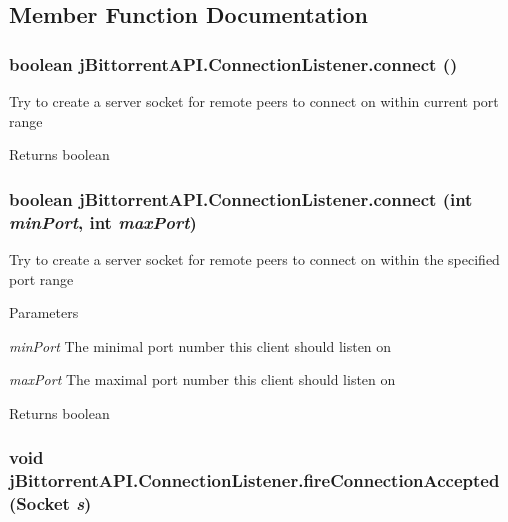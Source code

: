 \subsection{Member Function Documentation}
\hypertarget{classj_bittorrent_a_p_i_1_1_connection_listener_a973370bdec55e913c544902f89512c93}{
\subsubsection[{connect}]{\setlength{\rightskip}{0pt plus 5cm}boolean jBittorrentAPI.ConnectionListener.connect ()}}
\label{classj_bittorrent_a_p_i_1_1_connection_listener_a973370bdec55e913c544902f89512c93}
Try to create a server socket for remote peers to connect on within current port range \begin{DoxyReturn}{Returns}
boolean 
\end{DoxyReturn}
\hypertarget{classj_bittorrent_a_p_i_1_1_connection_listener_a386740f5e18aeeeae7c43c9debe0744e}{
\subsubsection[{connect}]{\setlength{\rightskip}{0pt plus 5cm}boolean jBittorrentAPI.ConnectionListener.connect (int {\em minPort}, \/  int {\em maxPort})}}
\label{classj_bittorrent_a_p_i_1_1_connection_listener_a386740f5e18aeeeae7c43c9debe0744e}
Try to create a server socket for remote peers to connect on within the specified port range 
\begin{DoxyParams}{Parameters}
\item[{\em minPort}]The minimal port number this client should listen on \item[{\em maxPort}]The maximal port number this client should listen on \end{DoxyParams}
\begin{DoxyReturn}{Returns}
boolean 
\end{DoxyReturn}
\hypertarget{classj_bittorrent_a_p_i_1_1_connection_listener_aca6fadfba821799d0c47ca04fee3e963}{
\subsubsection[{fireConnectionAccepted}]{\setlength{\rightskip}{0pt plus 5cm}void jBittorrentAPI.ConnectionListener.fireConnectionAccepted (Socket {\em s})}}
